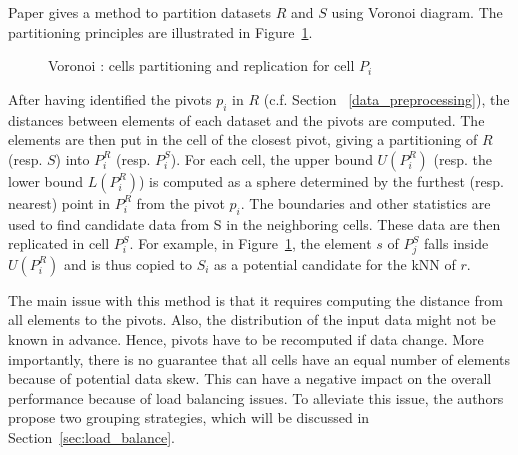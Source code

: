 Paper \cite{Lu:2012:EPK:2336664.2336674} gives a method to partition  datasets $R$ and $S$ using Voronoi diagram. 
The partitioning principles are illustrated in Figure~\ref{fig:voronoi_partition_figure}. 
\begin{figure}[h]
\centering
{}
                \caption{Voronoi : cells partitioning and replication for cell $P_i$%
                }
                \label{fig:voronoi_partition_figure}         
\end{figure}%
After having identified the pivots $p_i$ in $R$ (c.f. Section~ \ref{data_preprocessing}), the distances between 
elements of each dataset and the pivots are computed. The elements are then put in the cell of the closest 
pivot, giving a partitioning of $R$ (resp. $S$) into $P_i^R$ (resp. $P_i^S$). For each cell, the upper bound 
$U(P^{R}_{i})$ (resp. the lower bound $L(P^{R}_{i})$) is computed as a sphere determined by the furthest (resp. 
nearest) point in $P_i^R$ from the pivot $p_i$.  The boundaries and other statistics are used to find 
candidate data from S in the neighboring cells. These data are then replicated in cell $P_i^S$. For example, in 
Figure~\ref{fig:voronoi_partition_figure}, the element $s$ of $P^{S}_{j}$ falls inside $U(P^{R}_{i})$ and is thus 
copied to $S_i$ as a potential candidate for the kNN of $r$.%



The main issue with this method is that it requires computing the distance from all elements to the pivots. Also, the distribution of the input data might 
not be known in advance. Hence, pivots have to be recomputed if data change.
 More importantly, there is no 
guarantee that all cells have an equal number of elements because of potential data skew. This can have a negative impact on the overall performance
because of load balancing issues. To alleviate this issue, the authors propose two grouping strategies, which will be discussed in 
Section~\ref{sec:load_balance}.

